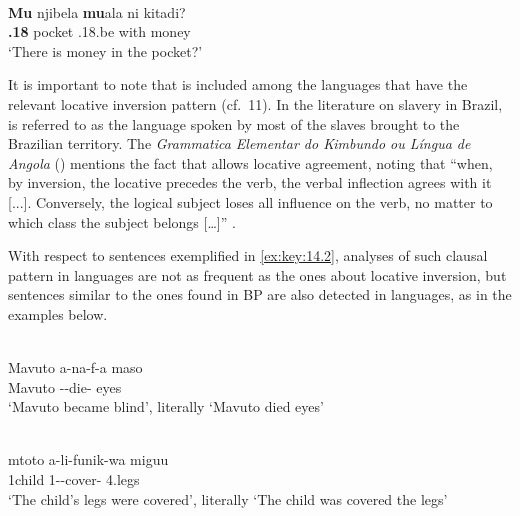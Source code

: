 \documentclass[output=paper]{langsci/langscibook}
\begin{document}
\ea\label{ex:key:14.11}  \parencite[244]{AvelarGalves2016}\\
    \gll    \textbf{Mu} njibela \textbf{mu}ala ni kitadi?\\
    \textbf{\Loc{}.18} pocket \Loc{}.18.be with money\\
    \glt    ‘There is money in the pocket?’
\z

It is important to note that  is included among the languages that have
the relevant locative inversion pattern (cf.\ 11). In the literature on slavery
in Brazil,  is referred to as the language spoken by most of the slaves
brought to the Brazilian territory. The \emph{Grammatica Elementar do Kimbundo
ou Língua de Angola} (\citealt{Chatelain1888}) mentions the fact that
 allows locative agreement, noting that “when, by inversion, the
locative precedes the verb, the verbal inflection agrees with it [...].
Conversely, the logical subject loses all influence on the verb, no matter to
which class the subject belongs [\dots]” \parencite[89]{Chatelain1888}.

With respect to  sentences exemplified in \eqref{ex:key:14.2},
analyses of such clausal pattern in  languages are not as frequent as the
ones about locative inversion, but  sentences similar to the
ones found in \gls{BP} are also detected in  languages, as in the
examples below.

\ea\label{ex:key:14.12}  \parencite[23]{Simango2007}\\
    \gll    Mavuto a-na-f-a maso\\
            Mavuto \Sm-\Pst{}-die-\Fv{} eyes\\
    \glt    ‘Mavuto became blind’, literally \enquote*{Mavuto died eyes}
\z

\ea\label{ex:key:14.13}  \parencite[83]{KeachRochemont1992}\\
    \gll    mtoto   a-li-funik-wa miguu\\
            1child 1-\Pst{}-cover-\Pass{} 4.legs\\
    \glt    ‘The child’s legs were covered’, literally ‘The child was covered the legs’
\z
\end{document}
